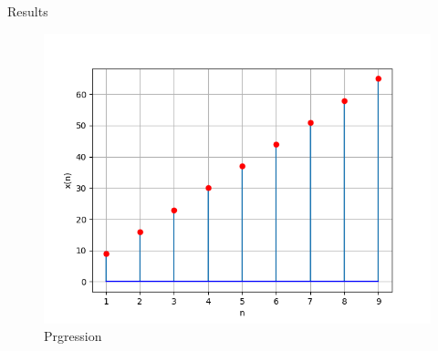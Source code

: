 \documentclass[journal,12pt,twocolumn]{IEEEtran}
\theoremstyle{remark}
\begin{document}
\begin{enumerate}
\begin{table}[h!]
\centering

\vspace{0.5cm}
\caption{\normalsize Results}
\end{table}


\begin{figure}[h]
    \centering  

\includegraphics[width=\columnwidth]{graph.png}

\begin{center}
    \caption{Prgression}
\end{center}
    
    \label{fig:Sound Wave}
\end{figure}





\end{enumerate}
\end{document}
